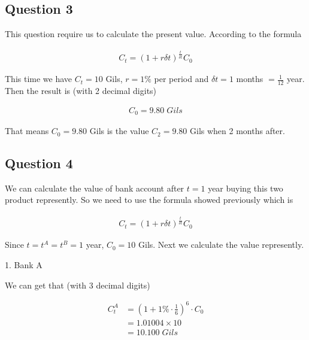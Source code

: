 \documentclass{report}
\begin{document}
\begin{spacing}{1.3541667}
\newpage

\begin{center}
    \section*{Question 3}
\end{center}

\par This question require us to calculate the present value. 
According to the formula 

\begin{align*}
    \boxed{C_t={(1+r\delta t)}^{\frac{t}{\delta t}}C_0}
\end{align*}

This time we have $C_t=10$ Gils, $r=1\%$ per period and $\delta t =1$ months $=\frac{1}{12}$ year. 
Then the result is (with 2 decimal digits)

\begin{align*}
    \boxed{C_0=9.80\;Gils}
\end{align*}

\par That means $C_0=9.80$ Gils is the value $C_2=9.80$ Gils when 2 months after. 


\newpage

\begin{center}
    \section*{Question 4}
\end{center}

\par We can calculate the value of bank account after $t=1$ year buying this two product represently. 
So we need to use the formula showed previously which is 

\begin{align*}
    \boxed{C_t={(1+r\delta t)}^{\frac{t}{\delta t}}C_0}
\end{align*}

Since $t=t^A=t^B=1$ year, $C_0=10$ Gils. Next we calculate the value represently. 

\par 1. Bank A

We can get that (with 3 decimal digits) 

\begin{align*}
    C^{A}_t&={(1+1\%\cdot \frac{1}{6})}^{6} \cdot C_0\\
    &=1.01004 \times 10\\
    &=10.100\;Gils
\end{align*}


\end{spacing}
\end{document}
